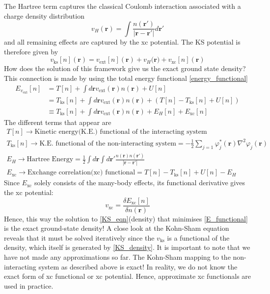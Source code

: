 The Hartree term captures the classical Coulomb interaction associated with a charge density distribution 
\begin{equation}
    v_H(\mathbf{r}) = \int \frac{n(\mathbf{r}')}{|\mathbf{r} - \mathbf{r}'|} d\mathbf{r}'
\end{equation}
and all remaining effects are captured by the xc potential. The KS potential is therefore given by
\begin{equation}
    v_{\text{ks}}[n](\mathbf{r}) = v_{\text{ext}}[n](\mathbf{r}) + v_H(\mathbf{r)} + v_{\text{xc}}[n](\mathbf{r})
\end{equation}
How does the solution of this framework give us the exact ground state density? This connection is made by using the total energy functional \eqref{energy_functional}
\begin{align}\label{E_functional}
    E_{v_{\text{ext}}}[n] &= T[n] + \int d\mathbf{r}v_{\text{ext}}(\mathbf{r})n(\mathbf{r}) + U[n] \\
    &= T_{\text{ks}}[n] + \int d\mathbf{r}v_{\text{ext}}(\mathbf{r})n(\mathbf{r}) + (T[n] - T_{\text{ks}}[n] + U[n]) \\
    &\equiv T_{\text{ks}}[n] + \int d\mathbf{r}v_{\text{ext}}(\mathbf{r})n(\mathbf{r}) + E_H[n] + E_{\text{xc}}[n]
\end{align}
The different terms that appear are
\begin{gather*}
    T[n] \rightarrow \text{Kinetic energy(K.E.) functional of the interacting system} \\
    T_{\text{ks}}[n] \rightarrow \text{K.E. functional of the non-interacting system} = -\frac{1}{2}\sum_{j=1}\varphi^*_j(\mathbf{r})\nabla^2\varphi_j(\mathbf{r}) \\
    E_H \rightarrow \text{Hartree Energy} = \frac{1}{2}\int d\mathbf{r}\int d\mathbf{r}'\frac{n(\mathbf{r})n(\mathbf{r}')}{|\mathbf{r}-\mathbf{r}'|} \\ 
    E_{\text{xc}} \rightarrow \text{Exchange correlation(xc) functional} = T[n] - T_{\text{ks}}[n] + U[n] - E_H
\end{gather*}
Since $E_{\text{xc}}$ solely consists of the many-body effects, its functional derivative gives the xc potential:
\begin{equation}
    v_{\text{xc}} = \frac{\delta E_{\text{xc}}[n]}{\delta n(\mathbf{r})} 
\end{equation}
Hence, this way the solution to \eqref{KS_eqn}(density) that minimises \eqref{E_functional} is the exact ground-state density! 
A close look at the Kohn-Sham equation reveals that it must be solved iteratively since the $v_{\text{ks}}$ is a functional of the density, which itself is generated by \eqref{KS_density}. It is important to note that we have not made any approximations so far. The Kohn-Sham mapping to the non-interacting system as described above is exact! In reality, we do not know the exact form of xc functional or xc potential. Hence, approximate xc functionals are used in practice. 
